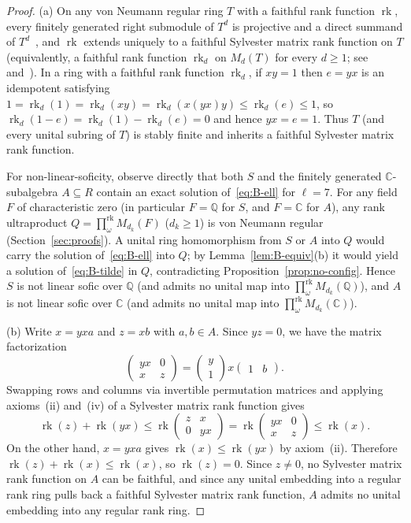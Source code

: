\documentclass[11pt]{article}
\theoremstyle{definition}
\theoremstyle{remark}
\numberwithin{equation}{section}
\DeclareMathOperator{\rk}{rk}
\newcommand{\RUF}[3]{\prod_{#1}^{\mathrm{rk}} M_{#2}(#3)}
\newcommand{\Q}{\mathbb{Q}}
\newcommand{\C}{\mathbb{C}}
\newcommand{\1}{\mathbf{1}}
\begin{document}
\begin{proof}
(a) On any von Neumann regular ring $T$ with a faithful rank function $\rk$, every finitely generated right submodule of $T^d$ is projective and a direct summand of $T^d$~\cite[Theorem~1.11]{Goodearl}, and $\rk$ extends uniquely to a faithful Sylvester matrix rank function on $T$ (equivalently, a faithful rank function $\rk_d$ on $M_d(T)$ for every $d \ge 1$; see~\cite[Proposition~16.1, Corollary~16.10]{Goodearl} and~\cite[Chapter~7]{Schofield1985}). In a ring with a faithful rank function $\rk_d$, if $xy = 1$ then $e = yx$ is an idempotent satisfying $1 = \rk_d(1) = \rk_d(xy) = \rk_d(x(yx)y) \le \rk_d(e) \le 1$, so $\rk_d(1 - e) = \rk_d(1) - \rk_d(e) = 0$ and hence $yx = e = 1$. Thus $T$ (and every unital subring of $T$) is stably finite and inherits a faithful Sylvester matrix rank function.

For non-linear-soficity, observe directly that both $S$ and the finitely generated $\C$-subalgebra $A \subseteq R$ contain an exact solution of~\eqref{eq:B-ell} for $\ell = 7$. For any field $F$ of characteristic zero (in particular $F = \Q$ for $S$, and $F = \C$ for $A$), any rank ultraproduct $Q = \RUF{\omega}{d_k}{F}$ ($d_k \ge 1$) is von Neumann regular (Section~\ref{sec:proofs}). A unital ring homomorphism from $S$ or $A$ into $Q$ would carry the solution of~\eqref{eq:B-ell} into $Q$; by Lemma~\ref{lem:B-equiv}(b) it would yield a solution of~\eqref{eq:B-tilde} in $Q$, contradicting Proposition~\ref{prop:no-config}. Hence $S$ is not linear sofic over $\Q$ (and admits no unital map into $\RUF{\omega}{d_k}{\Q}$), and $A$ is not linear sofic over $\C$ (and admits no unital map into $\RUF{\omega}{d_k}{\C}$).

(b) Write $x = yxa$ and $z = xb$ with $a, b \in A$. Since $yz = 0$, we have the matrix factorization
\[
\begin{pmatrix} yx & 0 \\ x & z \end{pmatrix}
= \begin{pmatrix} y \\ 1 \end{pmatrix} x \begin{pmatrix} 1 & b \end{pmatrix}.
\]
Swapping rows and columns via invertible permutation matrices and applying axioms~(ii) and~(iv) of a Sylvester matrix rank function gives
\[
\rk(z) + \rk(yx)
\le \rk\begin{pmatrix} z & x \\ 0 & yx \end{pmatrix}
= \rk\begin{pmatrix} yx & 0 \\ x & z \end{pmatrix}
\le \rk(x).
\]
On the other hand, $x = yxa$ gives $\rk(x) \le \rk(yx)$ by axiom~(ii). Therefore $\rk(z) + \rk(x) \le \rk(x)$, so $\rk(z) = 0$. Since $z \neq 0$, no Sylvester matrix rank function on $A$ can be faithful, and since any unital embedding into a regular rank ring pulls back a faithful Sylvester matrix rank function, $A$ admits no unital embedding into any regular rank ring.
\end{proof}
\end{document}
